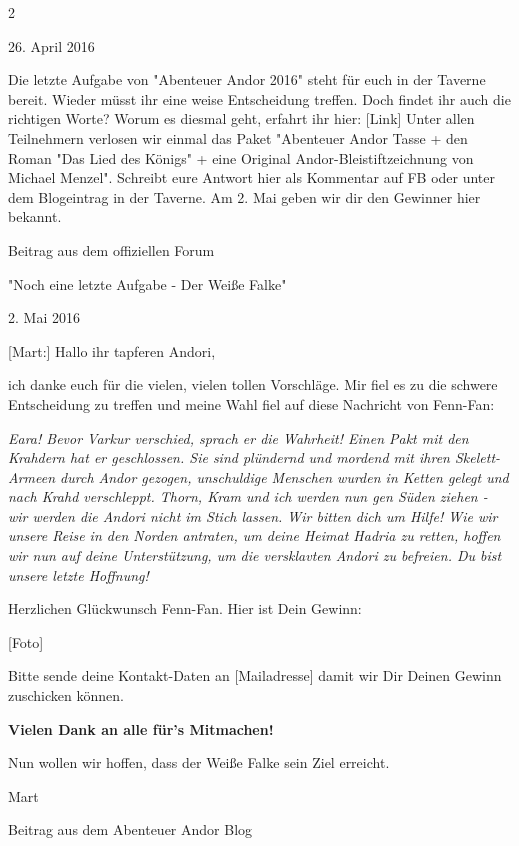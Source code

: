 \documentclass[10pt, a4paper, oneside]{book}
\begin{document}
\begin{multicols}{2}
\begin{center}
    26. April 2016
\end{center}


Die letzte Aufgabe von "Abenteuer Andor 2016" steht für euch in der Taverne bereit. Wieder müsst ihr eine weise Entscheidung treffen. Doch findet ihr auch die richtigen Worte? Worum es diesmal geht, erfahrt ihr hier: [Link] Unter allen Teilnehmern verlosen wir einmal das Paket "Abenteuer Andor Tasse + den Roman "Das Lied des Königs" + eine Original Andor-Bleistiftzeichnung von Michael Menzel". Schreibt eure Antwort hier als Kommentar auf FB oder unter dem Blogeintrag in der Taverne. Am 2. Mai geben wir dir den Gewinner hier bekannt.

\begin{center}
    Beitrag aus dem offiziellen Forum

    "Noch eine letzte Aufgabe - Der Weiße Falke"

    2. Mai 2016
\end{center}



[Mart:] Hallo ihr tapferen Andori,

ich danke euch für die vielen, vielen tollen Vorschläge. Mir fiel es zu die schwere Entscheidung zu treffen und meine Wahl fiel auf diese Nachricht von Fenn-Fan:

\textit{Eara! Bevor Varkur verschied, sprach er die Wahrheit! Einen Pakt mit den Krahdern hat er geschlossen. Sie sind plündernd und mordend mit ihren Skelett-Armeen durch Andor gezogen, unschuldige Menschen wurden in Ketten gelegt und nach Krahd verschleppt. Thorn, Kram und ich werden nun gen Süden ziehen - wir werden die Andori nicht im Stich lassen. Wir bitten dich um Hilfe! Wie wir unsere Reise in den Norden antraten, um deine Heimat Hadria zu retten, hoffen wir nun auf deine Unterstützung, um die versklavten Andori zu befreien. Du bist unsere letzte Hoffnung!}

Herzlichen Glückwunsch Fenn-Fan. Hier ist Dein Gewinn:

[Foto]

Bitte sende deine Kontakt-Daten an [Mailadresse] damit wir Dir Deinen Gewinn zuschicken können.

\textbf{Vielen Dank an alle für's Mitmachen!}

Nun wollen wir hoffen, dass der Weiße Falke sein Ziel erreicht.

Mart



\begin{center}
    Beitrag aus dem Abenteuer Andor Blog


\end{center}
\end{multicols}
\end{document}
